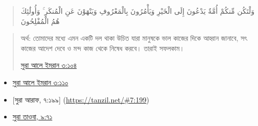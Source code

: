 \documentclass[
]{book}
\begin{document}
\begin{quote}
وَلْتَكُن مِّنكُمْ أُمَّةٌ يَدْعُونَ إِلَى الْخَيْرِ وَيَأْمُرُونَ بِالْمَعْرُوفِ وَيَنْهَوْنَ عَنِ الْمُنكَرِ ۚ وَأُولَٰئِكَ هُمُ الْمُفْلِحُونَ
\end{quote}

\begin{quote}
অর্থ: তোমাদের মধ্যে এমন একটি দল থাকা উচিত যারা মানুষকে ভাল কাজের দিকে আহ্বান জানাবে, সৎ কাজের আদেশ দেবে ও মন্দ কাজ থেকে নিষেধ করবে। তারাই সফলকাম।

\href{https://tanzil.net/\#3:104}{সুরা আলে ইমরান ৩:১০৪}
\end{quote}

\begin{itemize}
\item
  \href{https://tanzil.net/\#3:110}{সুরা আলে ইমরান ৩:১১০}
\item
  {[}সুরা আরাফ, ৭:১৯৯{]} (\url{https://tanzil.net/\#7:199})
\item
  \href{https://tanzil.net/\#9:71}{সুরা তাওবা, ৯:৭১}
\end{itemize}
\end{document}
